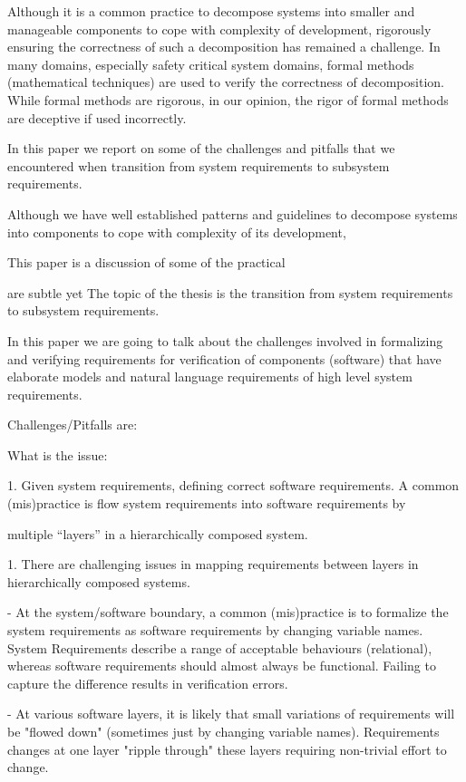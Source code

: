 

Although it is a common practice to decompose systems into smaller and manageable components to cope with complexity of development, rigorously ensuring the correctness of such a decomposition has remained a challenge. In many domains, especially safety critical system domains, formal methods (mathematical techniques) are used to verify the correctness of decomposition. While formal methods are rigorous, in our opinion, the rigor of formal methods are deceptive if used incorrectly.

In this paper we report on some of the challenges and pitfalls that we encountered when transition from system requirements to subsystem requirements.

Although we have well established patterns and guidelines to decompose systems into components to cope with complexity of its development, 

This paper is a discussion of some of the practical 

are subtle yet
The topic of the thesis is the transition from system requirements to subsystem requirements.

In this paper we are going to talk about the challenges involved in formalizing and verifying requirements for verification of components (software) that have elaborate models and natural language requirements of high level system requirements.

Challenges/Pitfalls are:

What is the issue:

1. Given system requirements, defining correct software requirements.  A common (mis)practice is flow system requirements into software requirements by

multiple ``layers'' in a hierarchically composed system.


1. There are challenging issues in mapping requirements between layers in hierarchically composed systems.

- At the system/software boundary, a common (mis)practice is to formalize the system requirements as software requirements by changing variable names. System Requirements describe a range of acceptable behaviours (relational), whereas software requirements should almost always be functional. Failing to capture the difference results in verification errors.

- At various software layers, it is likely that small variations of requirements will be "flowed down" (sometimes just by changing variable names).  Requirements changes at one layer "ripple through" these layers requiring non-trivial effort to change.

